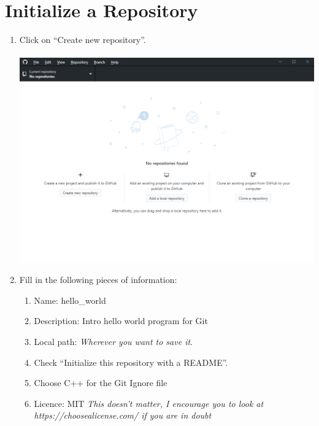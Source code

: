 \documentclass[12pt, letter]{article}
\begin{document}
    \section{Initialize a Repository}
    \begin{enumerate}  
        \item Click on ``Create new repository''. \\ \\
        \includegraphics{screenshots/shot1.bmp}
        
        \item Fill in the following pieces of information:
        
        \begin{enumerate}
            
            \item Name: hello\_world
            
            \item Description: Intro hello world program for Git
            
            \item Local path: \emph{Wherever you want to save it}.
            
            \item Check ``Initialize this repository with a README''.
            
            \item Choose C++ for the Git Ignore file
            
            \item Licence: MIT \emph{This doesn't matter, I encourage you to look at https://choosealicense.com/ if you are in doubt}
            

\end{enumerate}
\end{enumerate}
\end{document}
